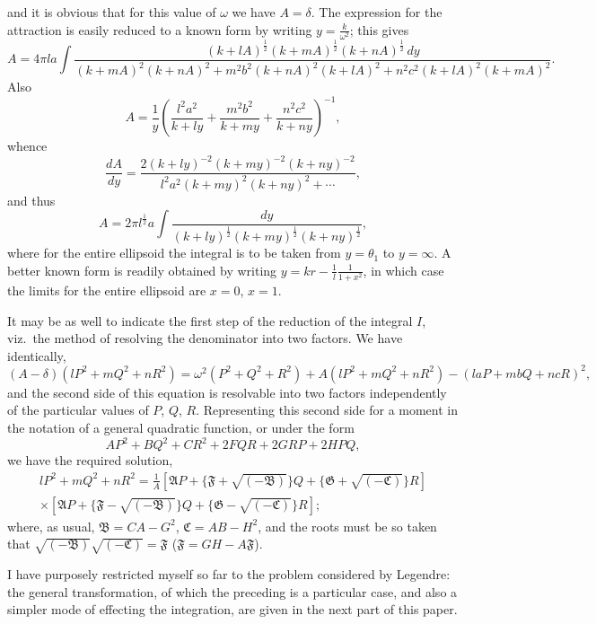 \documentclass[11pt,a4paper]{book}
\begin{document}
\newpage

\setcounter{page}{437}

and it is obvious that for this value of $\omega$ we have $A = \delta$. The expression for the attraction is easily reduced to a known form by writing $y = \frac{k}{\omega^{2}}$; this gives
\[
A = 4\pi la \int \frac{(k + lA)^{\frac{1}{2}}(k + mA)^{\frac{1}{2}}(k + nA)^{\frac{1}{2}}\, dy}{(k + mA)^{2}(k + nA)^{2} + m^{2}b^{2}(k + nA)^{2}(k + lA)^{2} + n^{2}c^{2}(k + lA)^{2}(k + mA)^{2}}.
\]
Also
\[
A = \frac{1}{y}\left(\frac{l^{2}a^{2}}{k + ly} + \frac{m^{2}b^{2}}{k + my} + \frac{n^{2}c^{2}}{k + ny}\right)^{-1},
\]
whence
\[
\frac{dA}{dy} = \frac{2(k + ly)^{-2}(k + my)^{-2}(k + ny)^{-2}}{l^{2}a^{2}(k + my)^{2}(k + ny)^{2} + \cdots},
\]
and thus
\[
A = 2\pi l^{\frac{1}{2}}a \int \frac{dy}{(k + ly)^{\frac{1}{2}}(k + my)^{\frac{1}{2}}(k + ny)^{\frac{1}{2}}},
\]
where for the entire ellipsoid the integral is to be taken from $y = \theta_{1}$ to $y = \infty$. A better known form is readily obtained by writing $y = kr - \frac{1}{l}\frac{1}{1 + x^{2}}$, in which case the limits for the entire ellipsoid are $x = 0$, $x = 1$.

It may be as well to indicate the first step of the reduction of the integral $I$, viz.\ the method of resolving the denominator into two factors. We have identically,
\[
(A - \delta)(lP^{2} + mQ^{2} + nR^{2}) = \omega^{2}(P^{2} + Q^{2} + R^{2}) + A(lP^{2} + mQ^{2} + nR^{2}) - (laP + mbQ + ncR)^{2},
\]
and the second side of this equation is resolvable into two factors independently of the particular values of $P$, $Q$, $R$. Representing this second side for a moment in the notation of a general quadratic function, or under the form
\[
AP^{2} + BQ^{2} + CR^{2} + 2FQR + 2GRP + 2HPQ,
\]
we have the required solution,
\begin{multline*}
lP^{2} + mQ^{2} + nR^{2} = \frac{1}{A}\left[\mathfrak{A}P + \{\mathfrak{F} + \sqrt{(-\mathfrak{B})}\}Q + \{\mathfrak{G} + \sqrt{(-\mathfrak{C})}\}R\right] \\
\times \left[\mathfrak{A}P + \{\mathfrak{F} - \sqrt{(-\mathfrak{B})}\}Q + \{\mathfrak{G} - \sqrt{(-\mathfrak{C})}\}R\right];
\end{multline*}
where, as usual, $\mathfrak{B} = CA - G^{2}$, $\mathfrak{C} = AB - H^{2}$, and the roots must be so taken that $\sqrt{(-\mathfrak{B})}\sqrt{(-\mathfrak{C})} = \mathfrak{F}$ ($\mathfrak{F} = GH - A\mathfrak{F}$).

I have purposely restricted myself so far to the problem considered by Legendre: the general transformation, of which the preceding is a particular case, and also a simpler mode of effecting the integration, are given in the next part of this paper.
\end{document}
